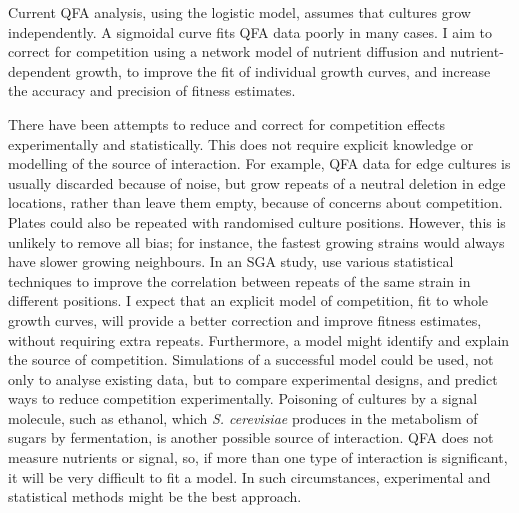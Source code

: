 Current QFA analysis, using the logistic model, assumes that cultures
grow independently. A sigmoidal curve fits QFA data poorly in many
cases.
I aim to correct for competition using a network model of nutrient
diffusion and nutrient-dependent growth, to improve the fit of
individual growth curves, and increase the accuracy and precision of
fitness estimates.

There have been attempts to reduce and correct for competition effects
experimentally and statistically. This does not require explicit
knowledge or modelling of the source of interaction.
For example, QFA data for edge cultures is usually discarded because
of noise, but \citet{Addinall2011} grow repeats of a neutral deletion
in edge locations, rather than leave them empty, because of concerns
about competition. Plates could also be repeated with randomised
culture positions. However, this is unlikely to remove all bias; for
instance, the fastest growing strains would always have slower growing
neighbours. In an SGA study, \citet{Baryshnikova2010} use various
statistical techniques to improve the correlation between repeats of
the same strain in different positions. I expect that an explicit
model of competition, fit to whole growth curves, will provide a
better correction and improve fitness estimates, without requiring
extra repeats. Furthermore, a model might identify and explain the
source of competition. Simulations of a successful model could be
used, not only to analyse existing data, but to compare experimental
designs, and predict ways to reduce competition
experimentally. Poisoning of cultures by a signal molecule, such as
ethanol, which \textit{S. cerevisiae} produces in the metabolism of
sugars by fermentation, is another possible source of interaction.
QFA does not measure nutrients or signal, so, if more than one type of
interaction is significant, it will be very difficult to fit a
model. In such circumstances, experimental and statistical methods
might be the best approach.

